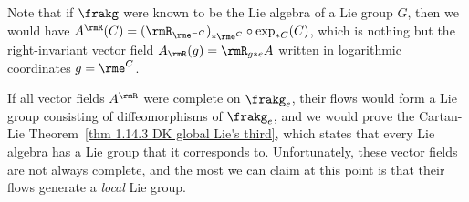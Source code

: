 \begin{rem}
    Note that if $\frakg$ were known to be the Lie algebra of a Lie group $G$, then we would have $A^\rmR(C)=\left(\rmR_{\rme^{-C}}\right)_{\ast \rme^C} \circ \exp_{\ast C}(C)$, which is nothing but the right-invariant vector field $A_\rmR(g)=\rmR_{g\ast e} A$ written in logarithmic coordinates $g=\rme^C$.

    If all vector fields $A^\rmR$ were complete on $\frakg_e$, their flows would form a Lie group consisting of diffeomorphisms of $\frakg_e$, and we would prove the Cartan-Lie Theorem~\ref{thm 1.14.3 DK global Lie's third}, which states that every Lie algebra has a Lie group that it corresponds to. Unfortunately, these vector fields are not always complete, and the most we can claim at this point is that their flows generate a \emph{local} Lie group.
\end{rem}


